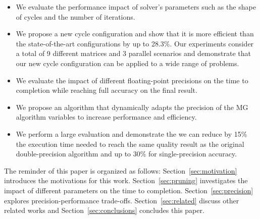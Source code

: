 \begin{itemize}

    \item We evaluate the performance impact of solver's parameters such
        as the shape of cycles and the number of iterations.

    \item We propose a new cycle configuration and show that it is more
        efficient than the state-of-the-art configurations by up to 28.3\%. 
        Our experiments consider a total of 9 different matrices and 3 parallel scenarios
        and demonstrate
        that our new cycle configuration can be applied to a wide range of problems.


    \item We evaluate the impact of different floating-point precisions on the
        time to completion while reaching full accuracy on the final result.

    \item We propose an algorithm that dynamically adapts the precision of the
        MG algorithm variables to increase performance and efficiency.

    \item We perform a large evaluation and demonstrate the we can reduce by
        15\% the execution time needed to reach the same quality result as the
        original double-precision algorithm and up to 30\% for single-precision
        accuracy.

\end{itemize}

The reminder of this paper is organized as follows:
Section~\ref{sec:motivation} introduces the motivations for this work.
Section~\ref{sec:pruning} investigates the impact of different parameters on
the time to completion.  Section~\ref{sec:precision} explores
precision-performance trade-offs.  Section~\ref{sec:related} discuss other
related works and Section~\ref{sec:conclusions} concludes this paper.

